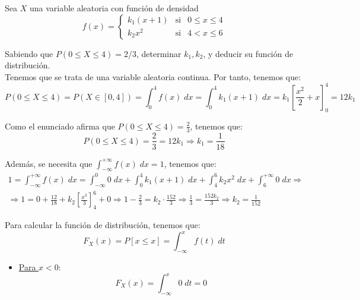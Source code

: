 \begin{ejercicio}
    Sea $X$ una variable aleatoria con función de densidad
    \begin{equation*}
        f(x) = \left\{\begin{array}{lll}
            k_1(x+1) & \text{si} & 0\leq x \leq 4 \\
            k_2x^2 & \text{si} & 4<x\leq 6
        \end{array}\right.
    \end{equation*}

    Sabiendo que $P(0 \leq X \leq 4) = 2/3$, determinar $k_1, k_2$, y deducir su función de distribución.\\

    Tenemos que se trata de una variable aleatoria continua. Por tanto, tenemos que:
    \begin{equation*}
        P(0\leq X\leq 4) = P(X\in [0,4]) = \int_0^4 f(x)\;dx = \int_0^4 k_1 (x+1)\;dx =  k_1 \left[\frac{x^2}{2}+x\right]_0^4 = 12k_1
    \end{equation*}

    Como el enunciado afirma que $P(0\leq X\leq 4) = \frac{2}{3}$, tenemos que:
    \begin{equation*}
        P(0\leq X\leq 4) = \frac{2}{3} = 12k_1\Longrightarrow k_1 = \frac{1}{18}
    \end{equation*}

    Además, se necesita que $\int_{-\infty}^{+\infty}f(x)\;dx=1$, tenemos que:
    \begin{multline*}
        1=\int_{-\infty}^{+\infty}f(x)\;dx
        = \int_{-\infty}^0 0\;dx + \int_{0}^4 k_1(x+1)\;dx + \int_4^6 k_2x^2\;dx + \int_{6}^{+\infty}0\;dx
        \Longrightarrow \\ \Longrightarrow
        1 = 0+\frac{12}{18}+ k_2\left[\frac{x^3}{3}\right]_4^6 + 0 \Longrightarrow 1-\frac{2}{3} = k_2\cdot \frac{152}{3}
        \Longrightarrow \frac{1}{3} = \frac{152k_2}{3} \Longrightarrow k_2 = \frac{1}{152}
    \end{multline*} 

    Para calcular la función de distribución, tenemos que:
    \begin{equation*}
        F_X(x) = P[x\leq x] = \int_{-\infty}^x f(t)\;dt
    \end{equation*}

    \begin{itemize}
        \item \underline{Para $x<0$}:
        \begin{equation*}
            F_X(x) = \int_{-\infty}^x 0\;dt = 0
        \end{equation*}


\end{itemize}
\end{ejercicio}
